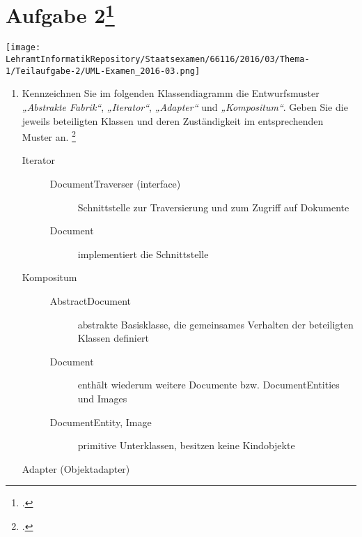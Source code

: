 \documentclass{lehramt-informatik-minimal}
\begin{document}
\section{Aufgabe 2\footcite{sosy:ab:6}}

\texttt{[image: \\LehramtInformatikRepository/Staatsexamen/66116/2016/03/Thema-1/Teilaufgabe-2/UML-Examen\_2016-03.png]}

\begin{enumerate}


\item Kennzeichnen Sie im folgenden Klassendiagramm die Entwurfsmuster
\emph{„Abstrakte Fabrik“}, \emph{„Iterator“}, \emph{„Adapter“} und
\emph{„Kompositum“}. Geben Sie die jeweils beteiligten Klassen und deren
Zuständigkeit im entsprechenden Muster an.
\footcite[StEx F16, T1, TA 2, A2 (abgeändert)]{examen:66116:2016:03}

\begin{antwort}

\begin{description}

%

\item[Iterator] \strut

\begin{description}
\item[DocumentTraverser (interface)]
Schnittstelle zur Traversierung und zum Zugriff auf Dokumente

\item[Document]
implementiert die Schnittstelle
\end{description}

%

\item[Kompositum] \strut

\begin{description}
\item[AbstractDocument]
abstrakte Basisklasse, die gemeinsames Verhalten der beteiligten
Klassen definiert

\item[Document]
enthält wiederum weitere Documente bzw. DocumentEntities und Images

\item[DocumentEntity, Image]
primitive Unterklassen, besitzen keine Kindobjekte
\end{description}

%

\item[Adapter (Objektadapter)] \strut


\end{description}
\end{antwort}
\end{enumerate}
\end{document}
